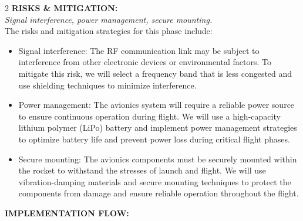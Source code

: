\documentclass[10pt]{report}
\begin{document}
\begin{multicols}{2}
  \noindent \textbf{\large RISKS \& MITIGATION:}\\  \textit{Signal interference, power management, secure mounting.}\\
  The risks and mitigation strategies for this phase include: \\
  \begin{itemize}
    \item Signal interference: The RF communication link may be subject to interference from other electronic devices or environmental factors. To mitigate this risk, we will select a frequency band that is less congested and use shielding techniques to minimize interference. \\

      \item Power management: The avionics system will require a reliable power source to ensure continuous operation during flight. We will use a high-capacity lithium polymer (LiPo) battery and implement power management strategies to optimize battery life and prevent power loss during critical flight phases. \\

        \item Secure mounting: The avionics components must be securely mounted within the rocket to withstand the stresses of launch and flight. We will use vibration-damping materials and secure mounting techniques to protect the components from damage and ensure reliable operation throughout the flight. \\
  \end{itemize}



\end{multicols}  
\noindent \textbf{IMPLEMENTATION FLOW:} \\
\vspace{0.5cm}
\end{document}
